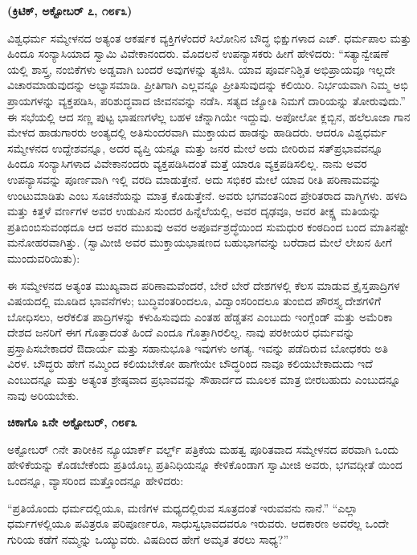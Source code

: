 \begin{center}
\textbf{(ಕ್ರಿಟಿಕ್​, ಅಕ್ಟೋಬರ್​ ೭, ೧೮೯೩)}
\end{center}

ವಿಶ್ವಧರ್ಮ ಸಮ್ಮೇಳನದ ಅತ್ಯಂತ ಆಕರ್ಷಕ ವ್ಯಕ್ತಿಗಳೆಂದರೆ ಸಿಲೋನಿನ ಬೌದ್ಧ ಭಿಕ್ಷುಗಳಾದ ಎಚ್​. ಧರ್ಮಪಾಲ ಮತ್ತು ಹಿಂದೂ ಸಂನ್ಯಾಸಿಯಾದ ಸ್ವಾಮಿ ವಿವೇಕಾನಂದರು. ಮೊದಲನೆ ಉಪನ್ಯಾಸಕರು ಹೀಗೆ ಹೇಳಿದರು: “ಸತ್ಯಾನ್ವೇಷಣೆ ಯಲ್ಲಿ ಶಾಸ್ತ್ರ, ನಂಬಿಕೆಗಳು ಅಡ್ಡವಾಗಿ ಬಂದರೆ ಅವುಗಳನ್ನು ತ್ಯಜಿಸಿ. ಯಾವ ಪೂರ್ವನಿಶ್ಚಿತ ಅಭಿಪ್ರಾಯವೂ ಇಲ್ಲದೇ ವಿಚಾರಮಾಡುವುದನ್ನು ಅಭ್ಯಾಸಮಾಡಿ. ಪ್ರೀತಿಗಾಗಿ ಎಲ್ಲವನ್ನೂ ಪ್ರೀತಿಸುವುದನ್ನು ಕಲಿಯಿರಿ. ನಿರ್ಭಯವಾಗಿ ನಿಮ್ಮ ಅಭಿ ಪ್ರಾಯಗಳನ್ನು ವ್ಯಕ್ತಪಡಿಸಿ, ಪರಿಶುದ್ಧವಾದ ಜೀವನವನ್ನು ನಡೆಸಿ. ಸತ್ಯದ ಜ್ಯೋತಿ ನಿಮಗೆ ದಾರಿಯನ್ನು ತೋರುವುದು.” ಈ ಸಭೆಯಲ್ಲಿ ಆದ ಸಣ್ಣ ಪುಟ್ಟ ಭಾಷಣಗಳೆಲ್ಲ ಬಹಳ ಚೆನ್ನಾಗಿಯೇ ಇದ್ದುವು. ಅಪೋಲೋ ಕ್ಲಬ್ಬಿನ, ಹಲೆಲೂಜಾ ಗಾನ ಮೇಳದ ಹಾಡುಗಾರರು ಅಂತ್ಯದಲ್ಲಿ ಅತಿಸುಂದರವಾಗಿ ಮುಕ್ತಾಯದ ಹಾಡನ್ನು ಹಾಡಿದರು. ಆದರೂ ವಿಶ್ವಧರ್ಮ ಸಮ್ಮೇಳನದ ಉದ್ದೇಶವನ್ನೂ, ಅದರ ವ್ಯಪ್ತಿ ಯನ್ನೂ ಮತ್ತು ಜನರ ಮೇಲೆ ಅದು ಬೀರಿರುವ ಸತ್​ಪ್ರಭಾವವನ್ನೂ ಹಿಂದೂ ಸಂನ್ಯಾಸಿಗಳಾದ ವಿವೇಕಾನಂದರು ವ್ಯಕ್ತಪಡಿಸಿದಂತೆ ಮತ್ತೆ ಯಾರೂ ವ್ಯಕ್ತಪಡಿಸಲಿಲ್ಲ. ನಾನು ಅವರ ಉಪನ್ಯಾಸವನ್ನು ಪೂರ್ಣವಾಗಿ ಇಲ್ಲಿ ವರದಿ ಮಾಡುತ್ತೇನೆ. ಅದು ಸಭಿಕರ ಮೇಲೆ ಯಾವ ರೀತಿ ಪರಿಣಾಮವನ್ನು ಉಂಟುಮಾಡಿತು ಎಂಬ ಸೂಚನೆಯನ್ನು ಮಾತ್ರ ಕೊಡುತ್ತೇನೆ. ಅವರು ಭಗವಂತನಿಂದ ಪ್ರೇರಿತರಾದ ವಾಗ್ಮಿಗಳು. ಹಳದಿ ಮತ್ತು ಕಿತ್ತಳೆ ವರ್ಣಗಳ ಅವರ ಉಡುಪಿನ ಸುಂದರ ಹಿನ್ನೆಲೆಯಲ್ಲಿ, ಅವರ ದೃಢವೂ, ಅವರ ತೀಕ್ಷ್ಣ ಮತಿಯನ್ನು ಪ್ರತಿಬಿಂಬಿಸುವಂಥದೂ ಆದ ಅವರ ಮುಖವು ಅವರ ಅಪೂರ್ವಶ್ರದ್ಧೆಯಿಂದ ಸುಮಧುರ ಕಂಠದಿಂದ ಬಂದ ಮಾತಿನಷ್ಟೇ ಮನೋಹರವಾಗಿತ್ತು. (ಸ್ವಾಮೀಜಿ ಅವರ ಮುಕ್ತಾಯಭಾಷಣದ ಬಹುಭಾಗವನ್ನು ಬರೆದಾದ ಮೇಲೆ ಲೇಖನ ಹೀಗೆ ಮುಂದುವರಿಯಿತು):

ಈ ಸಮ್ಮೇಳನದ ಅತ್ಯಂತ ಮುಖ್ಯವಾದ ಪರಿಣಾಮವೆಂದರೆ, ಬೇರೆ ಬೇರೆ ದೇಶಗಳಲ್ಲಿ ಕೆಲಸ ಮಾಡುವ ಕ್ರೈಸ್ತಪಾದ್ರಿಗಳ ವಿಷಯದಲ್ಲಿ ಮೂಡಿದ ಭಾವನೆಗಳು; ಬುದ್ಧಿವಂತರಿಂದಲೂ, ವಿದ್ವಾಂಸರಿಂದಲೂ ತುಂಬಿದ ಪೌರಸ್ತ್ಯ ದೇಶಗಳಿಗೆ ಬೋಧಿಸಲು, ಅರೆಕಲಿತ ಪಾದ್ರಿಗಳನ್ನು ಕಳುಹಿಸುವುದು ಎಂತಹ ಹೆಡ್ಡತನ ಎಂಬುದು ಇಂಗ್ಲೆಂಡ್​ ಮತ್ತು ಅಮೆರಿಕಾ ದೇಶದ ಜನರಿಗೆ ಈಗ ಗೊತ್ತಾದಂತೆ ಹಿಂದೆ ಎಂದೂ ಗೊತ್ತಾಗಿರಲಿಲ್ಲ. ನಾವು ಪರಕೀಯರ ಧರ್ಮವನ್ನು ಪ್ರಸ್ತಾಪಿಸಬೇಕಾದರೆ ಔದಾರ್ಯ ಮತ್ತು ಸಹಾನುಭೂತಿ ಇವುಗಳು ಅಗತ್ಯ. ಇವನ್ನು ಪಡೆದಿರುವ ಬೋಧಕರು ಅತಿ ವಿರಳ. ಬೌದ್ಧರು ಹೇಗೆ ನಮ್ಮಿಂದ ಕಲಿಯಬೇಕೋ ಹಾಗೇಯೇ ಬೌದ್ಧರಿಂದ ನಾವೂ ಕಲಿಯಬೇಕಾದುದು ಇದೆ ಎಂಬುದನ್ನೂ ಮತ್ತು ಅತ್ಯಂತ ಶ್ರೇಷ್ಠವಾದ ಪ್ರಭಾವವನ್ನು ಸೌಹಾರ್ದದ ಮೂಲಕ ಮಾತ್ರ ಬೀರಬಹುದು ಎಂಬುದನ್ನೂ ನಾವು ಅರಿಯಬೇಕು.

\delimiter

\textbf{ಚಿಕಾಗೊ ೩ನೇ ಅಕ್ಟೋಬರ್​, ೧೮೯೩} 

ಅಕ್ಟೋಬರ್​ ೧ನೇ ತಾರೀಕಿನ ನ್ಯೂಯಾರ್ಕ್​ ವರ್ಲ್ಡ್​ ಪತ್ರಿಕೆಯ ಮಹತ್ವ ಪೂರಿತವಾದ ಸಮ್ಮೇಳನದ ಪರವಾಗಿ ಒಂದು ಹೇಳಿಕೆಯನ್ನು ಕೊಡಬೇಕೆಂದು ಪ್ರತಿಯೊಬ್ಬ ಪ್ರತಿನಿಧಿಯನ್ನೂ ಕೇಳಿಕೊಂಡಾಗ ಸ್ವಾಮೀಜಿ ಅವರು, ಭಗವದ್ಗೀತೆ ಯಿಂದ ಒಂದನ್ನೂ, ವ್ಯಾಸರಿಂದ ಮತ್ತೊಂದನ್ನೂ ಹೇಳಿದರು:

“ಪ್ರತಿಯೊಂದು ಧರ್ಮದಲ್ಲಿಯೂ, ಮಣಿಗಳ ಮಧ್ಯದಲ್ಲಿರುವ ಸೂತ್ರದಂತೆ ಇರುವವನು ನಾನೆ.” “ಎಲ್ಲಾ ಧರ್ಮಗಳಲ್ಲಿಯೂ ಪವಿತ್ರರೂ ಪರಿಪೂರ್ಣರೂ, ಸಾಧುಸ್ವಭಾವದವರೂ ಇರುವರು. ಆದಕಾರಣ ಅವರೆಲ್ಲ ಒಂದೇ ಗುರಿಯ ಕಡೆಗೆ ನಮ್ಮನ್ನು ಒಯ್ಯುವರು. ವಿಷದಿಂದ ಹೇಗೆ ಅಮೃತ ತರಲು ಸಾಧ್ಯ?”

